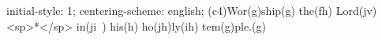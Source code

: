 initial-style: 1;
centering-scheme: english;
(c4)Wor(g)ship(g) the(fh) Lord(jv) <sp>*</sp> in(ji~) his(h) ho(jh)ly(ih) tem(g)ple.(g)
